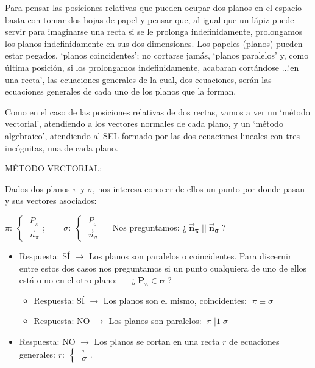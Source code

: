 Para pensar las posiciones relativas que pueden ocupar dos planos en el espacio basta con tomar dos hojas de papel y pensar que, al igual que un lápiz puede servir para imaginarse una recta si se le prolonga indefinidamente, prolongamos los planos indefinidamente en sus dos dimensiones. Los papeles (planos) pueden estar pegados, `planos coincidentes'; no cortarse jamás, `planos paralelos' y, como última posición, si los prolongamos indefinidamente, acabaran cortándose ...`en una recta', las ecuaciones generales de la cual, dos ecuaciones, serán las ecuaciones generales de cada uno de los planos que la forman.

Como en el caso de las posiciones relativas de dos rectas, vamos a ver un `método vectorial', atendiendo a los vectores normales de cada plano, y un `método algebraico', atendiendo al SEL formado por las dos ecuaciones lineales con tres incógnitas, una de cada plano.

\noindent MÉTODO VECTORIAL:

Dados dos planos $\pi$ y $\sigma$, nos interesa conocer de ellos un punto por donde pasan y sus vectores asociados:

$\pi:\; \begin{cases} \; P_{\pi} \\ \; \vec n_{\pi} \end{cases} ; \qquad 
\sigma:\; \begin{cases} \; P_{\sigma} \\ \; \vec n_{\sigma} \end{cases}\quad $
Nos preguntamos: ¿$\boldsymbol{ \; \vec n_{\pi} \;||\; \vec n_{\sigma}\; }$?

\begin{itemize}
\item Respuesta: SÍ $\to$ Los planos son paralelos o coincidentes. Para discernir entre estos dos casos nos preguntamos si un punto cualquiera de uno de ellos está o no en el otro plano:
$\quad$ ¿$\boldsymbol{ \; P_{\pi} \in \sigma\;} $?

	\begin{itemize}
	\item Respuesta: SÍ $\to$ Los planos son el mismo, coincidentes: $\;\pi \equiv \sigma$
	\item Respuesta: NO $\to$ Los planos son paralelos: $\;\pi \;|1\;\sigma$
	\end{itemize}
\item Respuesta: NO	$\to$ Los planos se cortan en una recta $r$ de ecuaciones generales: \footnotesize{$r:\; \begin{cases} \; \pi \\ \; \sigma \end{cases}$}\normalsize{.}
\end{itemize}

